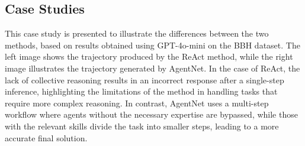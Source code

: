 \documentclass{article}
\begin{document}
\subsection{Case Studies}
This case study is presented to illustrate the differences between the two methods, based on results obtained using GPT-4o-mini on the BBH dataset. The left image shows the trajectory produced by the ReAct method, while the right image illustrates the trajectory generated by AgentNet. In the case of ReAct, the lack of collective reasoning results in an incorrect response after a single-step inference, highlighting the limitations of the method in handling tasks that require more complex reasoning. In contrast, AgentNet uses a multi-step workflow where agents without the necessary expertise are bypassed, while those with the relevant skills divide the task into smaller steps, leading to a more accurate final solution.
\end{document}
